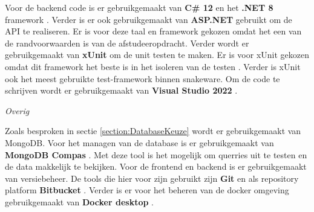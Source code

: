 \whitespace[2]
Voor de backend code is er gebruikgemaakt van \textbf{C\# 12} \parencite{CSharp} en het \textbf{.NET 8} framework \parencite{DotNet8}.
Verder is er ook gebruikgemaakt van \textbf{ASP.NET} \parencite{ASPNET} gebruikt om de API te realiseren.
Er is voor deze taal en framework gekozen omdat het een van de randvoorwaarden is van de afstudeeropdracht.
Verder wordt er gebruikgemaakt van \textbf{xUnit} \parencite{xUnit} om de unit testen te maken.
Er is voor xUnit gekozen omdat dit framework het beste is in het isoleren van de testen \parencite{IsolationTest}. 
Verder is xUnit ook het meest gebruikte test-framework binnen snakeware.
Om de code te schrijven wordt er gebruikgemaakt van \textbf{Visual Studio 2022} \parencite{VisualStudio}.

\whitespace[2]
\textit{Overig}

\whitespace[2]
Zoals besproken in sectie \ref{section:DatabaseKeuze} wordt er gebruikgemaakt van MongoDB.
Voor het managen van de database is er gebruikgemaakt van \textbf{MongoDB Compas} \parencite{MongoDBCompas}.
Met deze tool is het mogelijk om querries uit te testen en de data makkelijk te bekijken.
Voor de frontend en backend is er gebruikgemaakt van versiebeheer.
De tools die hier voor zijn gebruikt zijn \textbf{Git} \parencite{Git} en als repository platform \textbf{Bitbucket} \parencite{BitBucket}.
Verder is er voor het beheren van de docker omgeving gebruikgemaakt van \textbf{Docker desktop} \Parencite{DockerDesktop}.
